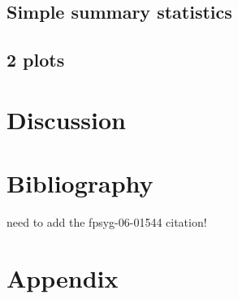 \documentclass{article}
\begin{document}
\subsection{Simple summary statistics}
\label{sec:org6bbef6a}
\subsection{2 plots}
\label{sec:org5e1c110}

\section{Discussion}
\label{sec:org772ad5f}

\section{Bibliography}
\label{sec:orgba8bb68}
need to add the fpsyg-06-01544 citation!


\section{Appendix}
\label{sec:orge57888a}
\end{document}
